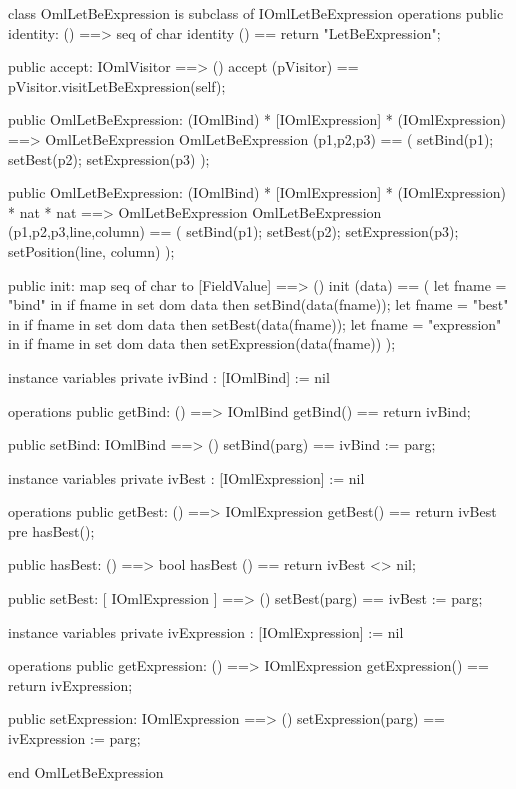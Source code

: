 \begin{vdm_al}
class OmlLetBeExpression is subclass of IOmlLetBeExpression
operations
  public identity: () ==> seq of char
  identity () == return "LetBeExpression";

  public accept: IOmlVisitor ==> ()
  accept (pVisitor) == pVisitor.visitLetBeExpression(self);

  public OmlLetBeExpression:
    (IOmlBind) *
    [IOmlExpression] *
    (IOmlExpression) ==> OmlLetBeExpression
  OmlLetBeExpression (p1,p2,p3) == 
    ( setBind(p1);
      setBest(p2);
      setExpression(p3) );

  public OmlLetBeExpression:
    (IOmlBind) *
    [IOmlExpression] *
    (IOmlExpression) *
    nat *
    nat ==> OmlLetBeExpression
  OmlLetBeExpression (p1,p2,p3,line,column) == 
    ( setBind(p1);
      setBest(p2);
      setExpression(p3);
      setPosition(line, column) );

  public init: map seq of char to [FieldValue] ==> ()
  init (data) ==
    ( let fname = "bind" in
        if fname in set dom data
        then setBind(data(fname));
      let fname = "best" in
        if fname in set dom data
        then setBest(data(fname));
      let fname = "expression" in
        if fname in set dom data
        then setExpression(data(fname)) );

instance variables
  private ivBind : [IOmlBind] := nil

operations
  public getBind: () ==> IOmlBind
  getBind() == return ivBind;

  public setBind: IOmlBind ==> ()
  setBind(parg) == ivBind := parg;

instance variables
  private ivBest : [IOmlExpression] := nil

operations
  public getBest: () ==> IOmlExpression
  getBest() == return ivBest
    pre hasBest();

  public hasBest: () ==> bool
  hasBest () == return ivBest <> nil;

  public setBest: [ IOmlExpression ] ==> ()
  setBest(parg) == ivBest := parg;

instance variables
  private ivExpression : [IOmlExpression] := nil

operations
  public getExpression: () ==> IOmlExpression
  getExpression() == return ivExpression;

  public setExpression: IOmlExpression ==> ()
  setExpression(parg) == ivExpression := parg;

end OmlLetBeExpression
\end{vdm_al}

